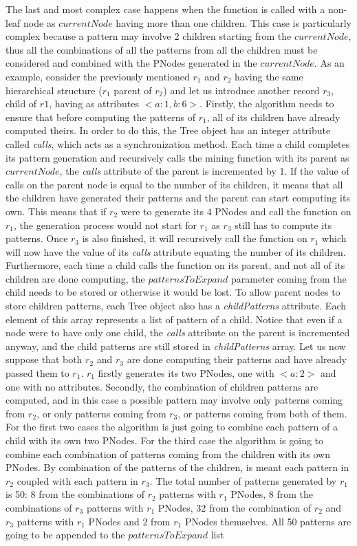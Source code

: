 \documentclass{acm_proc_article-sp-sigmod09}
\begin{document}
The last and most complex case happens when the function is called with a non-leaf node as $currentNode$ having more than one children. This case is particularly complex because a pattern may involve 2 children starting from the $currentNode$, thus all the combinations of all the patterns from all the children must be considered and combined with the PNodes generated in the $currentNode$. As an example, consider the previously mentioned $r_1$ and $r_2$ having the same hierarchical structure ($r_1$ parent of $r_2$) and let us introduce another record $r_3$, child of $r1$, having as attributes $<a \colon 1, b \colon 6>$. Firstly, the algorithm needs to ensure that before computing the patterns of $r_1$, all of its children have already computed theirs. In order to do this, the Tree object has an integer attribute called \emph{calls}, which acts as a synchronization method. Each time a child completes its pattern generation and recursively calls the mining function with its parent as $currentNode$, the \emph{calls} attribute of the parent is incremented by 1. If the value of calls on the parent node is equal to the number of its children, it means that all the children have generated their patterns and the parent can start computing its own. This means that if $r_2$ were to generate its 4 PNodes and call the function on $r_1$, the generation process would not start for $r_1$ as $r_3$ still has to compute its patterns. Once $r_3$ is also finished, it will recursively call the function on $r_1$ which will now have the value of its \emph{calls} attribute equating the number of its children. Furthermore, each time a child calls the function on its parent, and not all of its children are done computing, the $patternsToExpand$ parameter coming from the child needs to be stored or otherwise it would be lost. To allow parent nodes to store children patterns, each Tree object also has a \emph{childPatterns} attribute. Each element of this array represents a list of pattern of a child. Notice that even if a node were to have only one child, the \emph{calls} attribute on the parent is incremented anyway, and the child patterns are still stored in \emph{childPatterns} array. Let us now suppose that both $r_2$ and $r_3$ are done computing their patterns and have already passed them to $r_1$. $r_1$ firstly generates its two PNodes, one with $<a \colon 2>$ and one with no attributes. Secondly, the combination of children patterns are computed, and in this case a possible pattern may involve only patterns coming from $r_2$, or only patterns coming from $r_3$, or patterns coming from both of them. For the first two cases the algorithm is just going to combine each pattern of a child with its own two PNodes. For the third case the algorithm is going to combine each combination of patterns coming from the children with its own PNodes. By combination of the patterns of the children, is meant each pattern in $r_2$ coupled with each pattern in $r_3$. The total number of patterns generated by $r_1$ is 50: 8 from the combinations of $r_2$ patterns with $r_1$ PNodes, 8 from the combinations of $r_3$ patterns with $r_1$ PNodes, 32 from the combination of $r_2$ and $r_3$ patterns with $r_1$ PNodes and 2 from $r_1$ PNodes themselves. All 50 patterns are going to be appended to the $patternsToExpand$ list 
\end{document}
